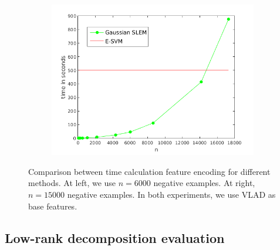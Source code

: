 \begin{figure}[!h]
\begin{subfigure}[b]{0.32\textwidth}
\includegraphics[width=\textwidth]{speed_n.png}
\end{subfigure}
\caption{Comparison between time calculation feature encoding for different methods. At left, we use $n=6000$ negative examples. At right, $n=15000$ negative examples. In both experiments, we use VLAD as base features.}
\label{time:scalar}
\end{figure}

\subsection{Low-rank decomposition evaluation}

